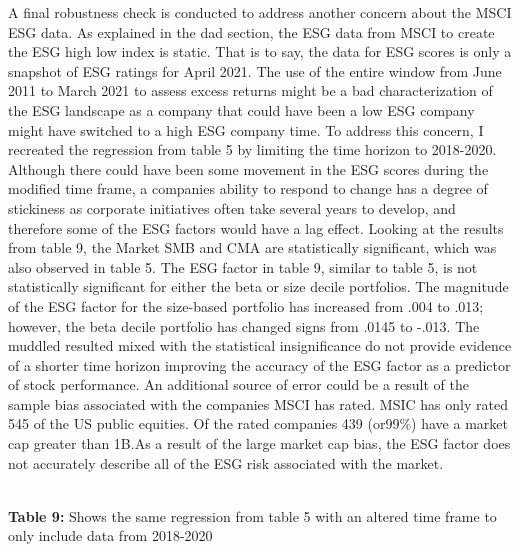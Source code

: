 A final robustness check is conducted to address another concern about the MSCI ESG data. As explained in the dad section, the ESG data from MSCI to create the ESG high low index is static. That is to say, the data for ESG scores is only a snapshot of ESG ratings for April 2021. The use of the entire window from June 2011 to March 2021 to assess excess returns might be a bad characterization of the ESG landscape as a company that could have been a low ESG company might have switched to a high ESG company time. To address this concern, I recreated the regression from table 5 by limiting the time horizon to 2018-2020. Although there could have been some movement in the ESG scores during the modified time frame, a companies ability to respond to change has a degree of stickiness as corporate initiatives often take several years to develop, and therefore some of the ESG factors would have a lag effect.  Looking at the results from table 9, the Market SMB and CMA are statistically significant, which was also observed in table 5. The ESG factor in table 9, similar to table 5, is not statistically significant for either the beta or size decile portfolios. The magnitude of the  ESG factor for the size-based portfolio has increased from .004 to .013; however, the beta decile portfolio has changed signs from .0145 to -.013. The muddled resulted mixed with the statistical insignificance do not provide evidence of a shorter time horizon improving the accuracy of the ESG factor as a predictor of stock performance. An additional source of error could be a result of the sample bias associated with the companies MSCI has rated. MSIC has only rated 545 of the US public equities. Of the rated companies 439 (or99\%) have a market cap greater than 1B.As a result of the large market cap bias, the ESG factor does not accurately describe all of the ESG risk associated with the market. 
 
 \begin{center}
    \paperspacingnarrow
    \\
    \textbf{Table 9:} Shows the same regression from table 5 with an altered time frame to only include data from 2018-2020
    
    \paperspacingwide
\end{center}
 
 

